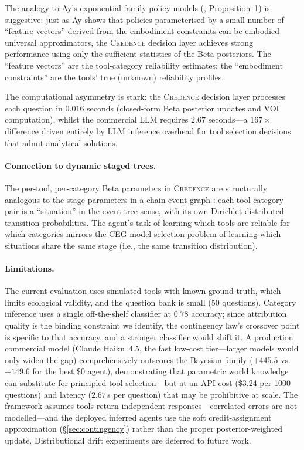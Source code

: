 \documentclass[11pt]{article}
\newcommand{\credence}{\textsc{Credence}}
\begin{document}
The analogy to Ay's exponential family policy models (\citealt{ay2015geometric}, Proposition~1) is suggestive: just as Ay shows that policies parameterised by a small number of ``feature vectors'' derived from the embodiment constraints can be embodied universal approximators, the \credence{} decision layer achieves strong performance using only the sufficient statistics of the Beta posteriors. The ``feature vectors'' are the tool-category reliability estimates; the ``embodiment constraints'' are the tools' true (unknown) reliability profiles.

The computational asymmetry is stark: the \credence{} decision layer processes each question in $0.016$ seconds (closed-form Beta posterior updates and VOI computation), whilst the commercial LLM requires $2.67$ seconds---a $167\times$ difference driven entirely by LLM inference overhead for tool selection decisions that admit analytical solutions.

\paragraph{Connection to dynamic staged trees.}
The per-tool, per-category Beta parameters in \credence{} are structurally analogous to the stage parameters in a chain event graph \citep{freeman2011bayesian}: each tool-category pair is a ``situation'' in the event tree sense, with its own Dirichlet-distributed transition probabilities. The agent's task of learning which tools are reliable for which categories mirrors the CEG model selection problem of learning which situations share the same stage (i.e., the same transition distribution).

\paragraph{Limitations.}
The current evaluation uses simulated tools with known ground truth, which limits ecological validity, and the question bank is small (50 questions). Category inference uses a single off-the-shelf classifier at $0.78$ accuracy; since attribution quality is the binding constraint we identify, the contingency law's crossover point is specific to that accuracy, and a stronger classifier would shift it. A production commercial model (Claude Haiku~4.5, the fast low-cost tier---larger models would only widen the gap) comprehensively outscores the Bayesian family ($+445.5$ vs.\ $+149.6$ for the best \$0 agent), demonstrating that parametric world knowledge can substitute for principled tool selection---but at an API cost (\$3.24 per 1000 questions) and latency ($2.67$\,s per question) that may be prohibitive at scale. The framework assumes tools return independent responses---correlated errors are not modelled---and the deployed inferred agents use the soft credit-assignment approximation (\S\ref{sec:contingency}) rather than the proper posterior-weighted update. Distributional drift experiments are deferred to future work.
\end{document}
